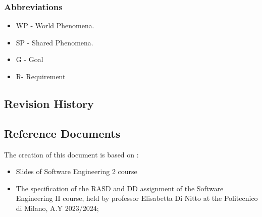 \subsubsection{Abbreviations}
\begin{itemize}
    \item WP - World Phenomena.
    \item SP - Shared Phenomena.
    \item G - Goal
    \item R- Requirement
\end{itemize}


\subsection{Revision History}

\subsection{Reference Documents}
The creation of this document is based on :
\begin{itemize}
    \item Slides of Software Engineering 2 course
    \item  The specification of the RASD and DD assignment of the Software Engineering II course, held by professor Elisabetta Di Nitto at the Politecnico di Milano, A.Y 2023/2024;
\end{itemize}
\newpage
